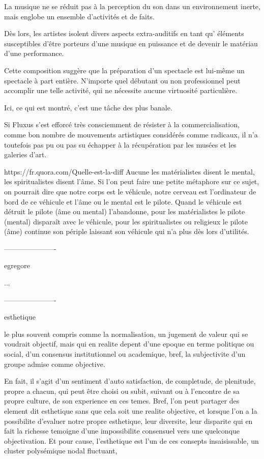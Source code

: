 La musique ne se réduit pas à la perception du son dans un  environnement inerte, mais englobe un ensemble d'activités et de faits.

Dès lors, les artistes isolent divers aspects extra-auditifs en tant qu’ éléments susceptibles d’être porteurs d’une musique en puissance et de devenir le matériau  d'une performance. 


Cette composition suggère que la préparation d'un  spectacle est
lui-même un spectacle à part entière. N’importe quel débutant ou non professionnel peut accomplir une telle activité, qui ne nécessite aucune virtuosité particulière.

Ici, ce qui est montré, c’est une tâche des plus banale.

Si Fluxus s’est efforcé très consciemment de résister à la commercialisation, comme bon nombre de mouvements artistiques considérés comme radicaux, il n'a toutefois pas pu ou pas su échapper à la récupération par les musées et les galeries d'art. 

https://fr.quora.com/Quelle-est-la-diff%
Aucune les matérialistes disent le mental, les spiritualistes disent l’âme.
Si l’on peut faire une petite métaphore sur ce sujet, on pourrait dire que notre corps est le véhicule, notre cerveau est l’ordinateur de bord de ce véhicule et l’âme ou le mental est le pilote. Quand le véhicule est détruit le pilote (âme ou mental) l’abandonne, pour les matérialistes le pilote (mental) disparaît avec le véhicule, pour les spiritualistes ou religieux le pilote (âme) continue son périple laissant son véhicule qui n’a plus dès lors d’utilités.

----------------------

egregore

...

----------------------

esthetique


le plus souvent compris comme la normalisation, un jugement de valeur qui se voudrait objectif, mais qui en realite depent d'une epoque en terme politique ou social, d'un consensus institutionnel ou academique, bref, la subjectivite d'un groupe admise comme objective.

En fait, il s'agit d'un sentiment d'auto satisfaction, de completude, de plenitude, propre a chacun, qui peut être choisi ou subit, suivant ou à l'encontre de sa propre culture, de son experience en ces temes. Bref, l'on peut partager des element dit esthetique sans que cela soit une realite objective, et lorsque l'on a la possibilite d'evaluer notre propre esthetique, leur diversite, leur disparite  qui en fait la richesse temoigne d'une impossibilite consensuel vers une quelconque objectivation. Et pour cause, l'esthetique est l'un de ces consepts insaisissable, un cluster polysémique nodal fluctuant,


 